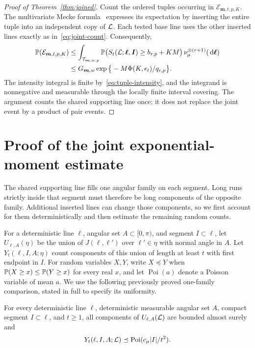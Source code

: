 \documentclass[11pt,letterpaper]{article}
\begin{document}
\begin{proof}[Proof of Theorem~\ref{thm:joined}]
Count the ordered tuples occurring in $\mathcal E_{\boldsymbol m,t,p,K}$. The multivariate Mecke formula~\cite[Theorem~4.4]{LP17} expresses its expectation by inserting the entire tuple into an independent copy of $\cL$. Each tested base line uses the other inserted lines exactly as in~\eqref{eq:joint-count}. Consequently,
\begin{equation}\label{eq:mecke}
\begin{aligned}
 \P(\mathcal E_{\boldsymbol m,t,p,K})
 &\le\int_{\mathcal T_{\boldsymbol m,w,p}}
       \P\big(S_t(\cL;\boldsymbol\ell,\boldsymbol I)\ge b_{r,p}+KM\big)
                         \,\nu_\mu^{\otimes(r+1)}(\dd\boldsymbol\ell)\\
 &\le G_{\boldsymbol m,w}
                \exp\big\{-M\Phi(K,\epsilon_t)/q_{r,p}\big\}.
\end{aligned}
\end{equation}
The intensity integral is finite by~\eqref{eq:tuple-intensity}, and the integrand is nonnegative and measurable through the locally finite interval covering. The argument counts the shared supporting line once; it does not replace the joint event by a product of pair events.
\end{proof}

\section{Proof of the joint exponential-moment estimate}

The shared supporting line fills one angular family on each segment. Long runs strictly inside that segment must therefore be long components of the opposite family. Additional inserted lines can change those components, so we first account for them deterministically and then estimate the remaining random counts.

For a deterministic line $\ell$, angular set $A\subset[0,\pi)$, and segment $I\subset\ell$, let $U_{\ell,A}(\eta)$ be the union of $J(\ell,\ell')$ over $\ell'\in\eta$ with normal angle in $A$. Let $Y_t(\ell,I,A;\eta)$ count components of this union of length at least $t$ with first endpoint in $I$. For random variables $X,Y$, write $X\preceq Y$ when $\P(X\ge x)\le\P(Y\ge x)$ for every real $x$, and let $\operatorname{Poi}(a)$ denote a Poisson variable of mean $a$. We use the following previously proved one-family comparison, stated in full to specify its uniformity.

\begin{lemma}\label{lem:one-family}
For every deterministic line $\ell$, deterministic measurable angular set $A$, compact segment $I\subset\ell$, and $t\ge1$, all components of $U_{\ell,A}(\cL)$ are bounded almost surely and
\begin{equation}\label{eq:one-family}
 Y_t(\ell,I,A;\cL)\preceq\operatorname{Poi}(c_\mu|I|/t^2).
\end{equation}
\end{lemma}
\end{document}
